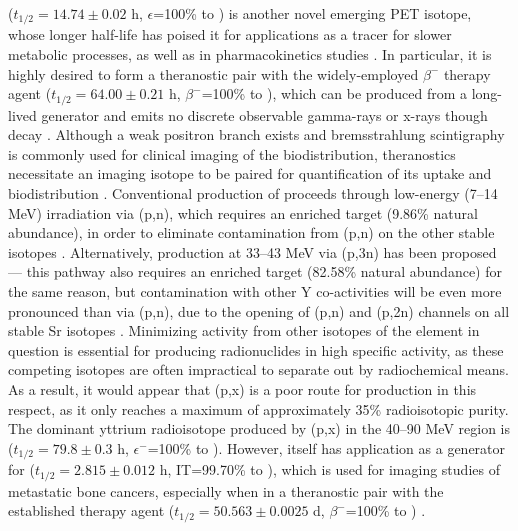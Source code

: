  ($t_{1/2}=14.74\pm0.02$ h, $\epsilon$=100\% to   \cite{NEGRET20151}) is another novel  emerging  PET isotope, whose longer half-life has poised it for applications as a tracer for slower metabolic processes, as well as in   pharmacokinetics studies \cite{Valdovinos2017,Nickles2003,Qaim2008,QaimSyedM2011}.
In particular, it is highly desired to form a theranostic pair with the widely-employed $\beta^-$ therapy agent  ($t_{1/2}=64.00\pm0.21$ h, $\beta^-$=100\% to  \cite{Browne1997}), which can be produced from a long-lived  generator and emits no discrete observable gamma-rays or x-rays though decay \cite{Herzog1993}.
Although a weak positron branch exists and bremsstrahlung scintigraphy is commonly used for clinical imaging of the  biodistribution, theranostics  necessitate an imaging isotope to be paired for quantification of its uptake and biodistribution  \cite{Nickles2004}.
Conventional production of  proceeds through low-energy (7--14 MeV) irradiation via (p,n), which requires an enriched   target (9.86\% natural abundance), in order to eliminate contamination from (p,n) on the other stable  isotopes  \cite{Rosch1993}.
Alternatively, production at 33--43 MeV via (p,3n) has been proposed --- this pathway also requires an enriched target (82.58\% natural abundance) for the same reason, but contamination with other Y co-activities will be even more pronounced than via (p,n), due to the opening of (p,n) and (p,2n) channels on all stable Sr isotopes \cite{doi:10.1139/v67-193,levkovski1991cross}.
Minimizing activity from other isotopes of the element in question is essential for producing radionuclides in high specific activity, as these competing isotopes are often impractical to separate out by radiochemical means.
As a result, it would appear that (p,x) is a poor route for   production in this respect, as it only reaches a maximum of approximately 35\% radioisotopic purity.
The  dominant yttrium radioisotope produced by  (p,x) in the 40--90 MeV region is   ($t_{1/2}=79.8\pm0.3$ h, $\epsilon^-$=100\% to  \cite{Johnson2015}).
However,   itself has application as a generator for   ($t_{1/2}=2.815\pm0.012$ h, IT=99.70\% to  \cite{Johnson2015}), which is used for imaging studies of metastatic bone cancers, especially when in a theranostic pair with the established therapy agent  ($t_{1/2}=50.563\pm0.0025$ d, $\beta^-$=100\% to  \cite{Singh2013}) \cite{Kiselev1974,Kandil2009}.





